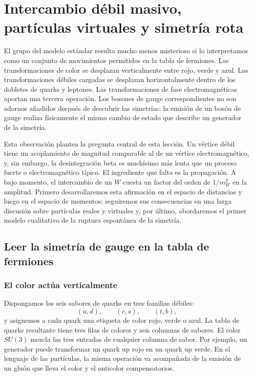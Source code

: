 \chapter{Intercambio débil masivo, partículas virtuales y simetría rota}

El grupo del modelo estándar resulta mucho menos misterioso si lo interpretamos como un conjunto de movimientos permitidos en la tabla de fermiones. Las transformaciones de color se desplazan verticalmente entre rojo, verde y azul. Las transformaciones débiles cargadas se desplazan horizontalmente dentro de los dobletes de quarks y leptones. Las transformaciones de fase electromagnéticas aportan una tercera operación. Los bosones de gauge correspondientes no son adornos añadidos después de descubrir las simetrías: la emisión de un bosón de gauge realiza físicamente el mismo cambio de estado que describe un generador de la simetría.

Esta observación plantea la pregunta central de esta lección. Un vértice débil tiene un acoplamiento de magnitud comparable al de un vértice electromagnético, y, sin embargo, la desintegración beta es muchísimo más lenta que un proceso fuerte o electromagnético típico. El ingrediente que falta es la propagación. A bajo momento, el intercambio de un \(W\) cuesta un factor del orden de \(1/m_W^2\) en la amplitud. Primero desarrollaremos esta afirmación en el espacio de distancias y luego en el espacio de momentos; seguiremos sus consecuencias en una larga discusión sobre partículas reales y virtuales y, por último, abordaremos el primer modelo cualitativo de la ruptura espontánea de la simetría.

\section{Leer la simetría de gauge en la tabla de fermiones}

\subsection{El color actúa verticalmente}

Dispongamos los seis sabores de quarks en tres familias débiles:
\begin{equation}
  (u,d),\qquad(c,s),\qquad(t,b),
\end{equation}
y asignemos a cada quark una etiqueta de color rojo, verde o azul. La tabla de quarks resultante tiene tres filas de colores y seis columnas de sabores. El color \(SU(3)\) mezcla las tres entradas de cualquier columna de sabor. Por ejemplo, un generador puede transformar un quark up rojo en un quark up verde. En el lenguaje de las partículas, la misma operación va acompañada de la emisión de un gluón que lleva el color y el anticolor compensatorios.

